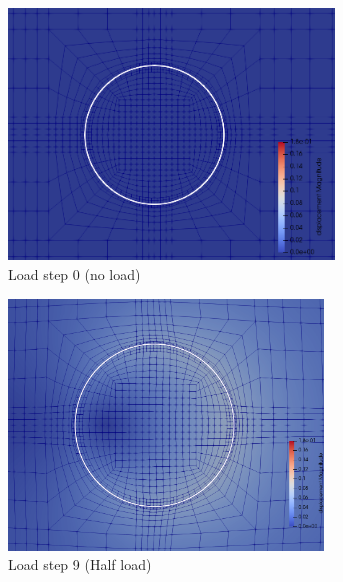 \documentclass[11pt,a4paper,final]{article}
\begin{document}
\begin{figure}[h!]
\centering 
\begin{subfigure}[b]{0.32\textwidth}
\centering
\includegraphics[width=0.95\textwidth]{vacuum_deformations_ls_0.png}
\caption{Load step 0 (no load)}
\label{fig:1.10.1}
\end{subfigure}
\begin{subfigure}[b]{0.32\textwidth}
\centering
\includegraphics[width=0.92\textwidth]{vacuum_deformations_half_load.png}
\caption{Load step 9 (Half load)}
\label{fig:1.10.2}
\end{subfigure}
\begin{subfigure}[b]{0.32\textwidth}
\centering

\end{subfigure}
\end{figure}
\end{document}
